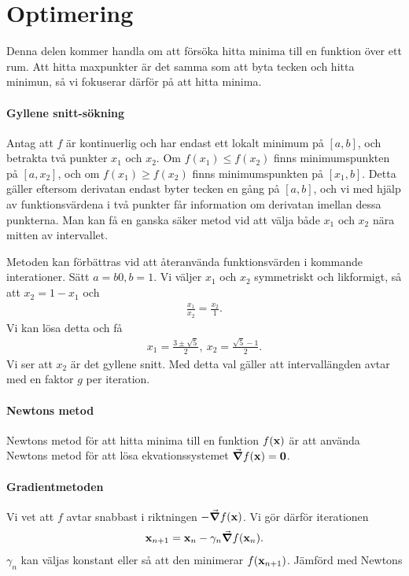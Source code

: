 \section{Optimering}
Denna delen kommer handla om att försöka hitta minima till en funktion över ett rum. Att hitta maxpunkter är det samma som att byta tecken och hitta minimun, så vi fokuserar därför på att hitta minima.

\paragraph{Gyllene snitt-sökning}
Antag att $f$ är kontinuerlig och har endast ett lokalt minimum på $[a, b]$, och betrakta två punkter $x_{1}$ och $x_{2}$. Om $f(x_{1}) \leq f(x_{2})$ finns minimumspunkten på $[a, x_{2}]$, och om $f(x_{1}) \geq f(x_{2})$ finns minimumspunkten på $[x_{1}, b]$. Detta gäller eftersom derivatan endast byter tecken en gång på $[a, b]$, och vi med hjälp av funktionsvärdena i två punkter får information om derivatan imellan dessa punkterna. Man kan få en ganska säker metod vid att välja både $x_{1}$ och $x_{2}$ nära mitten av intervallet.

Metoden kan förbättras vid att återanvända funktionsvärden i kommande interationer. Sätt $a = b0, b = 1$. Vi väljer $x_{1}$ och $x_{2}$ symmetriskt och likformigt, så att $x_{2} = 1 - x_{1}$ och
\begin{align*}
	\frac{x_{1}}{x_{2}} = \frac{x_{2}}{1}.
\end{align*}
Vi kan lösa detta och få
\begin{align*}
	x_{1} = \frac{3 \pm \sqrt{5}}{2},\ x_{2} = \frac{\sqrt{5} - 1}{2}.
\end{align*}
Vi ser att $x_{2}$ är det gyllene snitt. Med detta val gäller att intervallängden avtar med en faktor $g$ per iteration.

\paragraph{Newtons metod}
Newtons metod för att hitta minima till en funktion $f(\vb{x})$ är att använda Newtons metod för att lösa ekvationssystemet $\grad{f}(\vb{x}) = \vb{0}$.

\paragraph{Gradientmetoden}
Vi vet att $f$ avtar snabbast i riktningen $-\grad{f}(\vb{x})$. Vi gör därför iterationen
\begin{align*}
	\vb{x}_{n + 1} = \vb{x}_{n} - \gamma_{n}\grad{f}(\vb{x}_{n}).
\end{align*}
$\gamma_{n}$ kan väljas konstant eller så att den minimerar $f(\vb{x}_{n + 1})$. Jämförd med Newtons